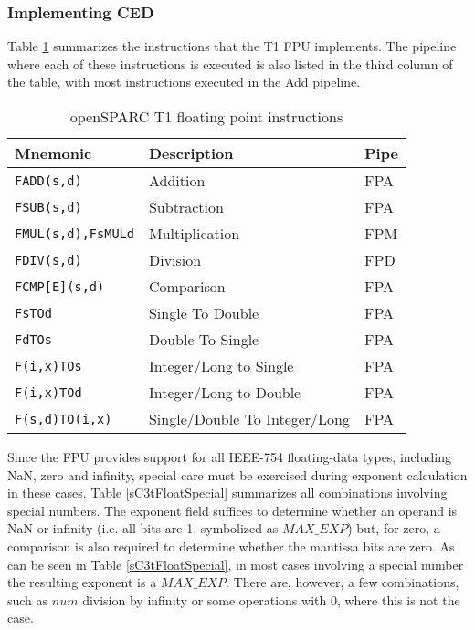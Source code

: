 \documentclass[12pt]{yalephd}
\begin{document}
\subsubsection{Implementing CED}

Table \ref{sC3tFloatInsts} summarizes the instructions that the T1 FPU implements. The pipeline where each of these instructions is executed is also listed in the third column of the table, with most instructions executed in the Add pipeline.

\begin{table}[!ht]
\caption{openSPARC T1 floating point instructions}\label{sC3tFloatInsts}
\begin{center}
\begin{threeparttable}[b]
\begin{tabular}{||l|l|l||}
\hline
\hline
{\bf Mnemonic} & {\bf Description} & {\bf Pipe} \\
\hline
\hline
{\tt FADD(s,d)} & Addition &FPA \\
\hline
{\tt FSUB(s,d)} & Subtraction &FPA \\
\hline
{\tt FMUL(s,d),FsMULd} & Multiplication &FPM \\
\hline
{\tt FDIV(s,d)} & Division &FPD \\
\hline
{\tt FCMP[E](s,d)} & Comparison &FPA \\
\hline
{\tt FsTOd} & Single To Double &FPA \\
\hline
{\tt FdTOs} & Double To Single &FPA \\
\hline
{\tt F(i,x)TOs} & Integer/Long to Single&FPA  \\
\hline
{\tt F(i,x)TOd} & Integer/Long to Double&FPA \\
\hline
{\tt F(s,d)TO(i,x)} & Single/Double To Integer/Long&FPA \\
\hline
\hline
\end{tabular}
\end{threeparttable}
\end{center}
\end{table}

Since the FPU provides support for all IEEE-754 floating-data types, including NaN, zero and infinity, special care must be exercised during exponent calculation in these cases. Table \ref{sC3tFloatSpecial} summarizes all combinations involving special numbers. The exponent field suffices to determine whether an operand is NaN or infinity (i.e. all bits are 1, symbolized as $MAX\_EXP$) but, for zero, a comparison is also required to determine whether the mantissa bits are zero. As can be seen in Table \ref{sC3tFloatSpecial}, in most cases involving a special number the resulting exponent is a $MAX\_EXP$. There are, however, a few combinations, such as $num$ division by infinity or some operations with 0, where this is not the case.
\end{document}
